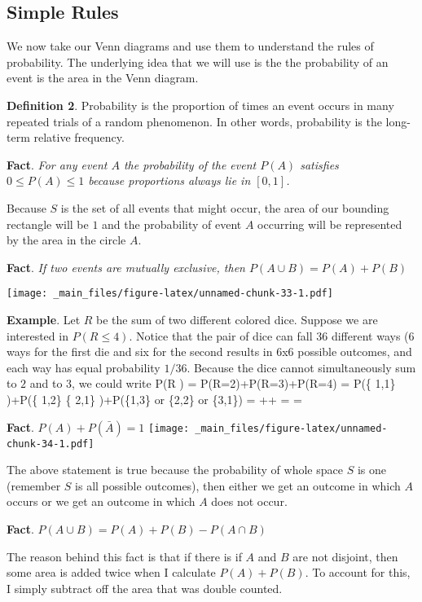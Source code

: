 \documentclass[]{book}
\begin{document}
\subsection{Simple Rules}\label{simple-rules}

We now take our Venn diagrams and use them to understand the rules of
probability. The underlying idea that we will use is the the probability
of an event is the area in the Venn diagram.

\textbf{Definition 2}. Probability is the proportion of times an event
occurs in many repeated trials of a random phenomenon. In other words,
probability is the long-term relative frequency.

\textbf{Fact}. \emph{For any event \(A\) the probability of the event
\(P(A)\) satisfies \(0\le P(A) \le 1\) because proportions always lie in
\([0,1]\).}

Because \(S\) is the set of all events that might occur, the area of our
bounding rectangle will be \(1\) and the probability of event \(A\)
occurring will be represented by the area in the circle \(A\).

\textbf{Fact}. \emph{If two events are mutually exclusive, then
\(P(A\cup B)=P(A)+P(B)\)}

\texttt{[image: \_main\_files/figure-latex/unnamed-chunk-33-1.pdf]}

\textbf{Example}. Let \(R\) be the sum of two different colored dice.
Suppose we are interested in \(P(R \le 4)\). Notice that the pair of
dice can fall 36 different ways (6 ways for the first die and six for
the second results in 6x6 possible outcomes, and each way has equal
probability \(1/36\). Because the dice cannot simultaneously sum to
\(2\) and to \(3\), we could write P(R  ) = P(R=2)+P(R=3)+P(R=4) =
P(\left\{ 1,1\right\} )+P(\left\{ 1,2\right\}
\left\{ 2,1\right\}
)+P(\{1,3\}\textrm{ or }\{2,2\}\textrm{ or }\{3,1\}) =
++ =  = 

\textbf{Fact}. \(P(A)+P(\bar{A})=1\)
\texttt{[image: \_main\_files/figure-latex/unnamed-chunk-34-1.pdf]}

The above statement is true because the probability of whole space \(S\)
is one (remember \(S\) is all possible outcomes), then either we get an
outcome in which \(A\) occurs or we get an outcome in which \(A\) does
not occur.

\textbf{Fact}. \(P(A\cup B)=P(A)+P(B)-P(A\cap B)\)

The reason behind this fact is that if there is if \(A\) and \(B\) are
not disjoint, then some area is added twice when I calculate
\(P\left(A\right)+P\left(B\right)\). To account for this, I simply
subtract off the area that was double counted.
\end{document}
